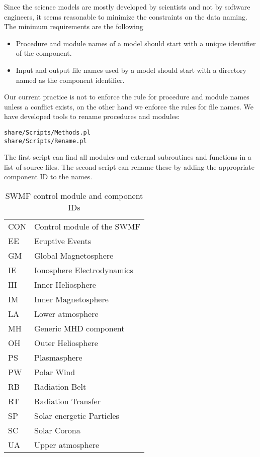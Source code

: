 \documentclass{article}
\begin{document}
Since the science models are mostly developed by scientists and not
by software engineers, it seems reasonable to minimize the constraints
on the data naming. The minimum requirements are the following
\begin{itemize}
\item Procedure and module names of a model should start with a unique 
      identifier of the component.
\item Input and output file names used by a model should start with a directory
      named as the component identifier.
\end{itemize}
Our current practice is not to enforce the rule for procedure and module
names unless a conflict exists, on the other hand we 
enforce the rules for file names. We have developed tools to rename procedures
and modules:
\begin{verbatim}
share/Scripts/Methods.pl
share/Scripts/Rename.pl
\end{verbatim}
The first script can find all modules and external subroutines and functions 
in a list of source files. The second script can rename these by adding
the appropriate component ID to the names.

\begin{table}
\caption{SWMF control module and component IDs}
\begin{center}
\begin{tabular}{ll}
CON & Control module of the SWMF\\
EE &  Eruptive Events \\
GM &  Global Magnetosphere \\
IE &  Ionosphere Electrodynamics \\
IH &  Inner Heliosphere \\
IM &  Inner Magnetosphere \\
LA &  Lower atmosphere \\
MH &  Generic MHD component\\
OH &  Outer Heliosphere \\
PS &  Plasmasphere \\
PW &  Polar Wind \\
RB &  Radiation Belt \\
RT &  Radiation Transfer \\
SP &  Solar energetic Particles \\
SC &  Solar Corona \\
UA &  Upper atmosphere
\end{tabular}
\end{center}
\label{tab:components}
\end{table}
\end{document}
